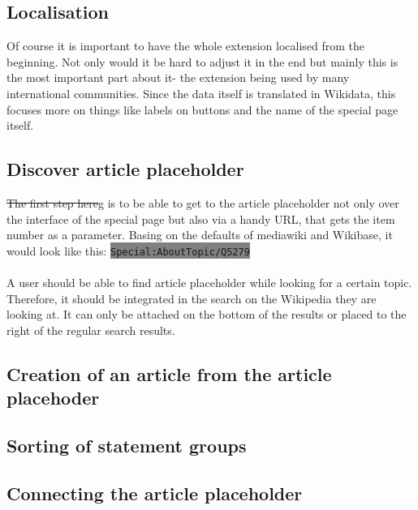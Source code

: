 \documentclass[11pt]{article}
\begin{document}
\subsection{Localisation}
Of course it is important to have the whole extension localised from the beginning. Not only would it be hard to adjust it in the end but mainly this is the most important part about it- the extension being used by many international communities. Since the data itself is translated in Wikidata, this focuses more on things like labels on buttons and the name of the special page itself. \\
\subsection{Discover article placeholder}
\st{The first step here}g is to be able to get to the article placeholder not only over the interface of the special page but also via a handy URL, that gets the item number as a parameter. Basing on the defaults of mediawiki and Wikibase, it would look like this: \colorbox{Gray}{\lstinline[basicstyle=\ttfamily\color{white}]|Special:AboutTopic/Q5279|} \\
\\
A user should be able to find article placeholder while looking for a certain topic. Therefore, it should be integrated in the search on the Wikipedia they are looking at. It can only be attached on the bottom of the results or placed to the right of the regular search results. %
%

\subsection{Creation of an article from the article placehoder}
%

\subsection{Sorting of statement groups}

%

\subsection{ Connecting the article placeholder }
%
\end{document}

